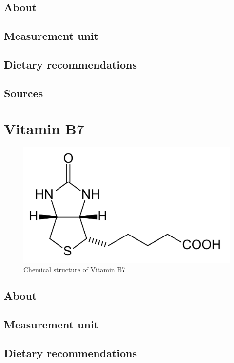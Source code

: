 \documentclass{book}
\begin{document}
\section{About}


\section{Measurement unit}


\section{Dietary recommendations}


\section{Sources}


\chapter{Vitamin B7}
\begin{figure}[h]
	\centering \includegraphics[width=0.75\linewidth]{images/Vitamin_B7_chemical_structure}
	\caption{Chemical structure of Vitamin B7}
\end{figure}

\section{About}


\section{Measurement unit}


\section{Dietary recommendations}
\end{document}
